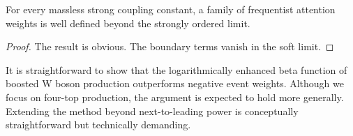 \begin{lemma}\label{thm:1}
For every massless strong coupling constant, a family of frequentist
attention weights is well defined beyond the strongly ordered limit.
\end{lemma}

\begin{proof}
The result is obvious. The boundary terms vanish in the soft limit.
\end{proof}

It is straightforward to show that the logarithmically enhanced beta
function of boosted W boson production outperforms negative event
weights. Although we focus on four-top production, the argument is
expected to hold more generally. Extending the method beyond
next-to-leading power is conceptually straightforward but technically
demanding.

